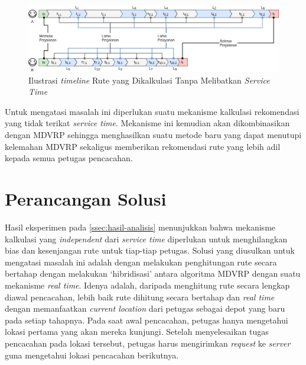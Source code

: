 \begin{figure}[!]
	\centering
	\includegraphics[width=\textwidth]{Resources/Images/illustration-timeline-mdvrp}
	\caption{Ilustrasi \textit{timeline} Rute yang Dikalkulasi Tanpa Melibatkan \textit{Service Time}}
	\label{fig:illustration-timeline-mdvrp}
\end{figure}


Untuk mengatasi masalah ini diperlukan suatu mekanisme kalkulasi rekomendasi yang tidak terikat \textit{service time}. Mekanisme ini kemudian akan dikombinasikan dengan MDVRP sehingga menghasilkan suatu metode baru yang dapat menutupi kelemahan MDVRP sekaligus memberikan rekomendasi rute yang lebih adil kepada semua petugas pencacahan. 


\section{Perancangan Solusi}
\label{sec:design}
Hasil eksperimen pada \autoref{ssec:hasil-analisis} menunjukkan bahwa mekanisme kalkulasi yang \textit{independent} dari \textit{service time} diperlukan untuk menghilangkan bias dan kesenjangan rute untuk tiap-tiap petugas. Solusi yang diusulkan untuk mengatasi masalah ini adalah dengan melakukan penghitungan rute secara bertahap dengan melakukan `hibridisasi' antara algoritma MDVRP dengan suatu mekanisme \textit{real time}. Idenya adalah, daripada menghitung rute secara lengkap diawal pencacahan, lebih baik rute dihitung secara bertahap dan \textit{real time} dengan memanfaatkan \textit{current location} dari petugas sebagai depot yang baru pada setiap tahapnya. Pada saat awal pencacahan, petugas hanya mengetahui lokasi pertama yang akan mereka kunjungi. Setelah menyelesaikan tugas pencacahan pada lokasi tersebut, petugas harus mengirimkan \textit{request} ke \textit{server} guna mengetahui lokasi pencacahan berikutnya.

